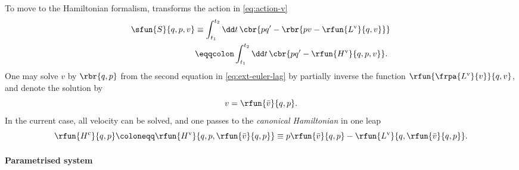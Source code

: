 \documentclass[a4paper]{article}
\begin{document}
To move to the Hamiltonian formalism, transforms the action in 
\cref{eq:action-v}
\begin{align}
\sfun{S}{q, p, v} &\equiv \int_{t_1}^{t_2}\dd t\,\cbr{pq' - 
\rbr{pv-\rfun{L^\text{v}}{q, v}}} \nonumber \\
&\eqqcolon \int_{t_1}^{t_2}\dd t\,\cbr{pq' - \rfun{H^\text{v}}{q, p, v}}.
\end{align}
One may solve $v$ by $\rbr{q, p}$ from the second equation in 
\cref{eq:ext-euler-lag} by partially inverse the function 
$\rfun{\frpa{L^\text{v}}{v}}{q, v}$, and denote the solution by
\begin{equation}
v = \rfun{\bar v}{q, p}.
\label{eq:v-bar-v}
\end{equation}
In the current case, all velocity can be solved, and one passes to the 
\emph{canonical Hamiltonian} in one leap
\begin{equation}
\rfun{H^\text{c}}{q, p} \coloneqq %
\rfun{H^\text{v}}{q, p, \rfun{\bar v}{q, p}} \equiv
p\rfun{\bar v}{q, p} - \rfun{L^\text{v}}{q, \rfun{\bar v}{q, p}}.
\end{equation}

\paragraph{Parametrised system}
\end{document}
